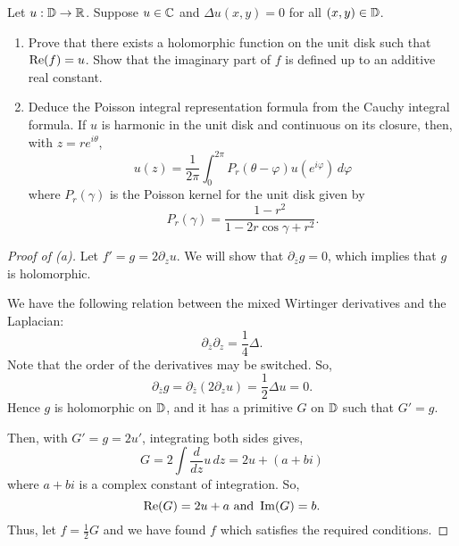 \documentclass[../hw2]{subfiles}
\begin{document}
\begin{problem}
Let $u: \mathbb{D} \to \mathbb{R}$. Suppose $u\in \mathbb{C}$ and $\Delta u(x,y)=0$ for all $(x,y)\in \mathbb{D}$.
\begin{enumerate}[label=(\alph*)]
	\item Prove that there exists a holomorphic function on the unit disk such that $\operatorname{Re}(f)=u$.
	      Show that the imaginary part of $f$ is defined up to an additive real constant.
	\item Deduce the Poisson integral representation formula from the Cauchy integral formula.
	      If $u$ is harmonic in the unit disk and continuous on its closure, then, with $z=re^{i\theta}$, \[
		      u(z)=\frac{1}{2\pi}\int_{0}^{2\pi} P_r(\theta-\varphi)u(e^{i\varphi}) \,d\varphi
	      \] where $P_r(\gamma)$ is the Poisson kernel for the unit disk given by  \[
		      P_r(\gamma) = \frac{1-r^2}{1-2r\cos{\gamma}+r^2}
		      .\]
\end{enumerate}
\end{problem}
\begin{proof}[Proof of (a)]
	Let $f'=g=2 \partial_z u$.
	We will show that $\partial_{\overline{z}} g = 0$, which implies that $g$ is holomorphic.

	We have the following relation between the mixed Wirtinger derivatives and the Laplacian: \[
		\partial_{\overline{z}}\partial_z = \frac{1}{4}\Delta
		.\]
	Note that the order of the derivatives may be switched.
	So, \[
		\partial_{\overline{z}} g = \partial_{\overline{z}}(2 \partial_z u) =  \frac{1}{2}\Delta u = 0
		.\]
	Hence $g$ is holomorphic on $\mathbb{D}$, and it has a primitive $G$ on  $\mathbb{D}$ such that $G' = g$.

	Then, with $G' = g = 2u'$, integrating both sides gives, \[
		G = 2 \int \frac{d}{dz} u \,dz = 2u + (a+bi)
	\] where $a+bi$ is a complex constant of integration.
	So, \[
		\operatorname{Re}(G)=2u+a \text{ and } \operatorname{Im}(G) = b
		.\]
	Thus, let $f=\frac{1}{2}G$ and we have found $f$ which satisfies the required conditions.
\end{proof}
\end{document}
